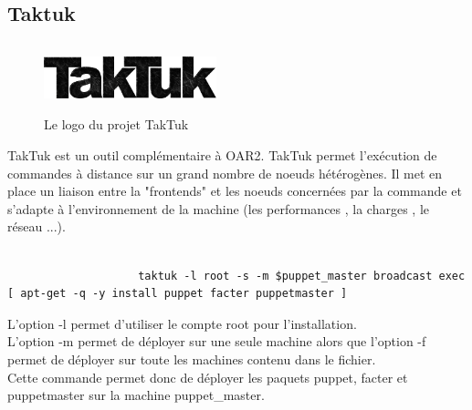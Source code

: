 \documentclass[a4paper, 10pt, onecolumn]{report}
\begin{document}
		\subsection{Taktuk}
		\begin{figure}[!h]
			\centering
   			\includegraphics[width=5cm,height=2cm]{TakTuk_Logo.png}
   			\caption{Le logo du projet TakTuk}
    		\label{fig:TakTuk}
		\end{figure} 
			TakTuk est un outil complémentaire à OAR2. TakTuk permet l'exécution de commandes à distance sur un grand nombre de noeuds hétérogènes. Il met en place un liaison entre la "frontends" et les noeuds concernées par la commande et s'adapte  à l'environnement de la machine (les performances , la charges , le réseau ...). \\
			\\ 
			\begin{lstlisting}
					taktuk -l root -s -m $puppet_master broadcast exec [ apt-get -q -y install puppet facter puppetmaster ]
			\end{lstlisting}
			L'option -l permet d'utiliser le compte root pour l'installation.\\
			L'option -m permet de déployer sur une seule machine alors que l'option -f permet de déployer sur toute les machines contenu dans le fichier.\\
			Cette commande permet donc de déployer les paquets puppet, facter et puppetmaster sur la machine puppet\_master.
			
\end{document}
